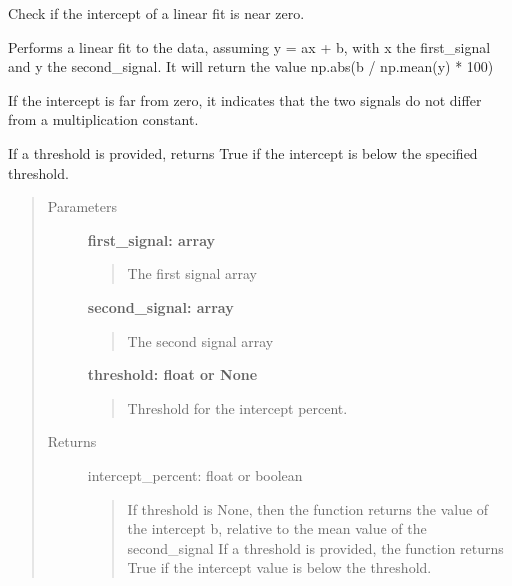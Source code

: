 \documentclass[letterpaper,10pt,english]{sphinxmanual}
\begin{document}
\begin{fulllineitems}
\label{fit_checks:fit_checks.check_linear_fit_intercept}
Check if the intercept of a linear fit is near zero.

Performs a linear fit to the data, assuming y = ax + b, with x the first\_signal
and y the second\_signal. It will return the value np.abs(b / np.mean(y) * 100)

If the intercept is far from zero, it indicates that the two signals
do not differ from a multiplication constant.

If a threshold is provided, returns True if the intercept is below
the specified threshold.
\begin{quote}\begin{description}
\item[{Parameters}] \leavevmode
\textbf{first\_signal: array}
\begin{quote}

The first signal array
\end{quote}

\textbf{second\_signal: array}
\begin{quote}

The second signal array
\end{quote}

\textbf{threshold: float or None}
\begin{quote}

Threshold for the intercept percent.
\end{quote}

\item[{Returns}] \leavevmode
intercept\_percent: float or boolean
\begin{quote}

If threshold is None, then the function returns the value of the intercept b, relative
to the mean value of the second\_signal
If a threshold is provided, the function returns True if the intercept value is
below the threshold.
\end{quote}

\end{description}\end{quote}

\end{fulllineitems}

\end{document}
